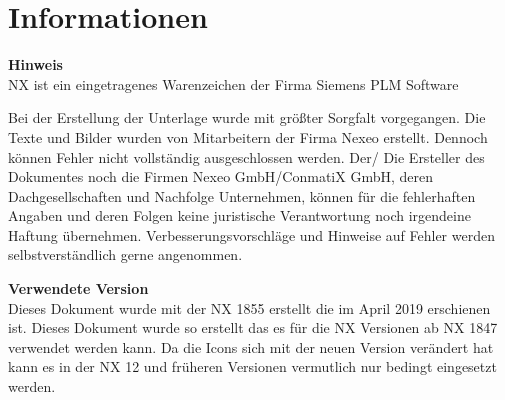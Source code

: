 \pagebreak
\section{Informationen}

\textbf{Hinweis}\\
 NX \textsuperscript{\texttrademark} ist ein eingetragenes Warenzeichen der Firma Siemens PLM Software

Bei der Erstellung der Unterlage wurde mit größter Sorgfalt vorgegangen. Die Texte und Bilder wurden von Mitarbeitern der Firma Nexeo erstellt. Dennoch können Fehler nicht vollständig ausgeschlossen werden. Der/ Die Ersteller des Dokumentes noch die Firmen Nexeo GmbH/ConmatiX GmbH, deren Dachgesellschaften und Nachfolge Unternehmen, können für die fehlerhaften Angaben und deren Folgen keine juristische Verantwortung noch irgendeine Haftung übernehmen. Verbesserungsvorschläge und Hinweise auf Fehler werden selbstverständlich gerne angenommen.

\textbf{Verwendete Version}\\
Dieses Dokument wurde mit der NX \textsuperscript{\texttrademark} 1855 erstellt die im April 2019 erschienen ist. Dieses Dokument wurde so erstellt das es für die NX Versionen ab NX\textsuperscript{\texttrademark} 1847 verwendet werden kann. Da die Icons sich mit der neuen Version verändert hat kann es in der NX\textsuperscript{\texttrademark} 12 und früheren Versionen vermutlich nur bedingt eingesetzt werden. 











